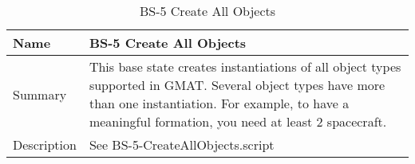 \begin{table}[htbp!]
\centering
      \begin{tabular}{|p{1.05 in} |p{4.75 in} |}
      \hline
         \rowcolor[rgb]{0.8,0.8,0.8} Name & BS-5 Create All Objects\\
         \hline
         Summary &
         This base state creates instantiations of all object types supported in GMAT.  Several
         object types have more than one instantiation.  For example, to have a meaningful
         formation, you need at least 2 spacecraft.
         \\ \hline
         Description & 
         See BS-5-CreateAllObjects.script
         \\ \hline
\end{tabular}
      \label{Table: BS-1}
      \caption{BS-5 Create All Objects}
\end{table}

